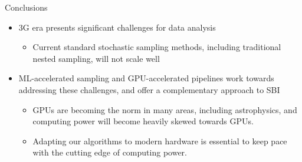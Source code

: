 \documentclass[aspectratio=169, 11pt]{beamer}
\begin{document}
\begin{frame}{Conclusions}
    \begin{itemize}
        \item 3G era presents significant challenges for data analysis
        \vspace{1em}
        \begin{itemize}
            \item Current standard stochastic sampling methods, including traditional nested sampling, will not scale well
        \end{itemize}
        \vspace{1em}
        \item ML-accelerated sampling and GPU-accelerated pipelines work towards addressing these challenges, and offer a complementary approach to SBI
       \vspace{1em}
        \begin{itemize}
                \item GPUs are becoming the norm in many areas, including astrophysics, and computing power will become heavily skewed towards GPUs.
                \item Adapting our algorithms to modern hardware is essential to keep pace with the cutting edge of computing power.
            \end{itemize}
    \end{itemize}
\end{frame}

\end{document}
